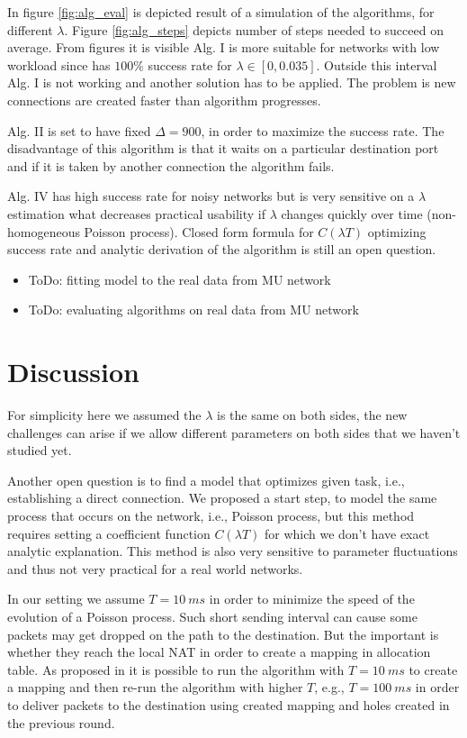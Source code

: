 \documentclass[twoside]{article}
\begin{document}
\begin{multicols}{2}
In figure \ref{fig:alg_eval} is depicted result of a simulation of 
the algorithms, for different $\lambda$. Figure \ref{fig:alg_steps} depicts number of steps needed 
to succeed on average. From figures it is visible Alg. I is more suitable for networks with low 
workload since has $100\%$ success rate for $\lambda \in [0, 0.035]$. Outside this interval 
Alg. I is not working and another solution has to be applied. The problem is new connections are
created faster than algorithm progresses.

Alg. II is set to have fixed $\Delta=900$, in order to maximize the success rate. The disadvantage of this
algorithm is that it waits on a particular destination port and if it is taken by another connection
the algorithm fails. 

Alg. IV has high success rate for 
noisy networks but is very sensitive on a $\lambda$ estimation what decreases practical usability 
if $\lambda$ changes quickly over time (non-homogeneous Poisson process). Closed form formula for $C(\lambda T)$ 
optimizing success rate and analytic derivation of the algorithm is still an open question. 

\begin{itemize}
 \item ToDo: fitting model to the real data from MU network
 \item ToDo: evaluating algorithms on real data from MU network
\end{itemize}

\section{Discussion}
For simplicity here we assumed the $\lambda$ is the same on both sides, the new challenges 
can arise if we allow different parameters on both sides that we haven't studied yet.

Another open question is to find a model that optimizes given task, i.e., establishing a direct
connection. We proposed a start step, to model the same process that occurs on the network, i.e.,
Poisson process, but this method requires setting a coefficient function $C(\lambda T)$ for which 
we don't have exact analytic explanation. This method is also very sensitive to parameter fluctuations
and thus not very practical for a real world networks. 

In our setting we assume $T=10~ms$ in order to minimize the speed of the evolution of a Poisson process.
Such short sending interval can cause some packets may get dropped on the path to the destination. But the 
important is whether they reach the local NAT in order to create a mapping in allocation table. As proposed 
in \citep{Wang:2006:RSN:1156422.1156550} it is possible to run the algorithm with $T=10~ms$ to create a mapping
and then re-run the algorithm with higher $T$, e.g., $T=100~ms$ in order to deliver packets to the destination
using created mapping and holes created in the previous round.


\end{multicols}
\end{document}

